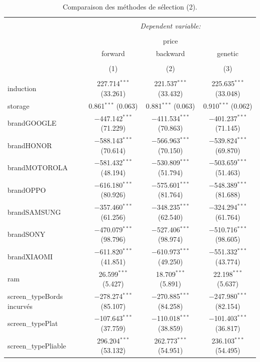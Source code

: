 \documentclass[
  12pt,
]{report}
\begin{document}
\begin{table}[!htbp] \centering 
  \caption{Comparaison des méthodes de sélection (2).} 
  \label{} 
\footnotesize 
\begin{tabular}{@{\extracolsep{5pt}}lccc} 
\\[-1.8ex]\hline 
\hline \\[-1.8ex] 
 & \multicolumn{3}{c}{\textit{Dependent variable:}} \\ 
\cline{2-4} 
\\[-1.8ex] & \multicolumn{3}{c}{price} \\ 
 & forward & backward & genetic \\ 
\\[-1.8ex] & (1) & (2) & (3)\\ 
\hline \\[-1.8ex] 
 induction & 227.714$^{***}$ (33.261) & 221.537$^{***}$ (33.432) & 225.635$^{***}$ (33.048) \\ 
  storage & 0.861$^{***}$ (0.063) & 0.881$^{***}$ (0.063) & 0.910$^{***}$ (0.062) \\ 
  brandGOOGLE & $-$447.142$^{***}$ (71.229) & $-$411.534$^{***}$ (70.863) & $-$401.237$^{***}$ (71.145) \\ 
  brandHONOR & $-$588.143$^{***}$ (70.614) & $-$566.963$^{***}$ (70.150) & $-$539.824$^{***}$ (69.870) \\ 
  brandMOTOROLA & $-$581.432$^{***}$ (48.194) & $-$530.809$^{***}$ (51.794) & $-$503.659$^{***}$ (51.463) \\ 
  brandOPPO & $-$616.180$^{***}$ (80.926) & $-$575.601$^{***}$ (81.764) & $-$548.389$^{***}$ (81.688) \\ 
  brandSAMSUNG & $-$357.460$^{***}$ (61.256) & $-$348.235$^{***}$ (62.540) & $-$324.294$^{***}$ (61.764) \\ 
  brandSONY & $-$470.079$^{***}$ (98.796) & $-$527.406$^{***}$ (98.974) & $-$510.716$^{***}$ (98.605) \\ 
  brandXIAOMI & $-$611.820$^{***}$ (41.851) & $-$610.973$^{***}$ (49.250) & $-$551.332$^{***}$ (43.774) \\ 
  ram & 26.599$^{***}$ (5.427) & 18.709$^{***}$ (5.891) & 22.198$^{***}$ (5.637) \\ 
  screen\_typeBords incurvés & $-$278.274$^{***}$ (85.107) & $-$270.885$^{***}$ (84.258) & $-$247.980$^{***}$ (82.154) \\ 
  screen\_typePlat & $-$107.643$^{***}$ (37.759) & $-$110.018$^{***}$ (38.859) & $-$101.403$^{***}$ (36.817) \\ 
  screen\_typePliable & 296.204$^{***}$ (53.132) & 262.773$^{***}$ (54.951) & 236.103$^{***}$ (54.495) \\ 

\end{tabular}
\end{table}
\end{document}
